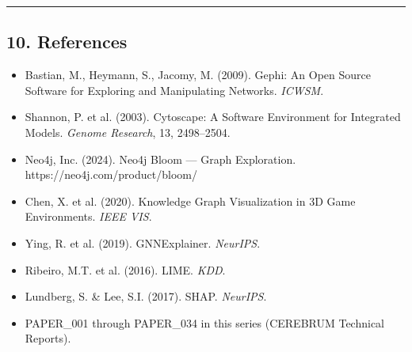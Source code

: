 \medskip\noindent\rule{\linewidth}{0.4pt}\medskip

\subsection*{10. References}

\begin{itemize}
  \item [gephi2009] Bastian, M., Heymann, S., Jacomy, M. (2009). Gephi: An Open Source Software for Exploring and Manipulating Networks. \textit{ICWSM}.
  \item [cytoscape2003] Shannon, P. et al. (2003). Cytoscape: A Software Environment for Integrated Models. \textit{Genome Research}, 13, 2498--2504.
  \item [neo4j2024bloom] Neo4j, Inc. (2024). Neo4j Bloom --- Graph Exploration. https://neo4j.com/product/bloom/
  \item [chen2020kg3d] Chen, X. et al. (2020). Knowledge Graph Visualization in 3D Game Environments. \textit{IEEE VIS}.
  \item [ying2019gnnexplainer] Ying, R. et al. (2019). GNNExplainer. \textit{NeurIPS}.
  \item [ribeiro2016lime] Ribeiro, M.T. et al. (2016). LIME. \textit{KDD}.
  \item [lundberg2017shap] Lundberg, S. \& Lee, S.I. (2017). SHAP. \textit{NeurIPS}.
  \item PAPER_001 through PAPER_034 in this series (CEREBRUM Technical Reports).
\end{itemize}
